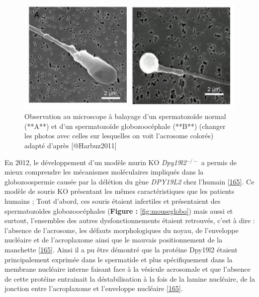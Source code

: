 \documentclass[12pt,twoside]{ugathesis}
\theoremstyle{definition}
\theoremstyle{definition}
\theoremstyle{remark}
\begin{document}
\begin{figure}

{\centering \includegraphics[scale=0.50]{figure/globo_normal_spz} 

}

\caption[Observation au microscope à balayage d'un spermatozoïde normal (**A**) et d'un spermatozoïde globozoocéphale (**B**) (changer les photos avec celles sur lesquelles on voit l'acrosome colorés)]{Observation au microscope à balayage d'un spermatozoïde normal (**A**) et d'un spermatozoïde globozoocéphale (**B**) (changer les photos avec celles sur lesquelles on voit l'acrosome colorés) adapté d'après [@Harbuz2011]}\label{fig:globospz}
\end{figure}

En 2012, le développement d'un modèle murin KO \emph{Dpy19l2}\(^{-/-}\)
a permis de mieux comprendre les mécanismes moléculaires impliqués dans
la globozoospermie causée par la délétion du gène \emph{DPY19L2} chez
l'humain {[}\protect\hyperlink{ref-Pierre2012}{165}{]}. Ce modèle de
souris KO présentant les mêmes caractéristiques que les patients humains
; Tout d'abord, ces souris étaient infertiles et présentaient des
spermatozoïdes globozoocéphales (\textbf{Figure : }\ref{fig:mouseglobo})
mais aussi et surtout, l'ensembles des autres dysfonctionnements étaient
retrouvés, c'est à dire : l'absence de l'acrosome, les défauts
morphologiques du noyau, de l'enveloppe nucléaire et de l'acroplaxome
ainsi que le mauvais positionnement de la manchette
{[}\protect\hyperlink{ref-Pierre2012}{165}{]}. Ainsi il a pu être
démontré que la protéine Dpy19l2 étaient principalement exprimée dans le
spermatide et plus spécifiquement dans la membrane nucléaire interne
faisant face à la vésicule acrosomale et que l'absence de cette protéine
entrainait la déstabilisation à la fois de la lamine nucléaire, de la
jonction entre l'acroplaxome et l'enveloppe nucléaire
{[}\protect\hyperlink{ref-Pierre2012}{165}{]}.
\end{document}
